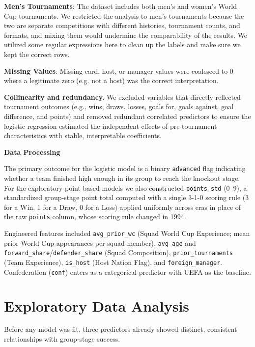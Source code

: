 \documentclass{article}
\begin{document}
\textbf {Men's Tournaments}: The dataset includes both men's and women's World Cup tournaments. We restricted the analysis to men's tournaments because the two are separate competitions with different histories, tournament counts, and formats, and mixing them would undermine the comparability of the results. We utilized some regular expressions here to clean up the labels and make sure we kept the correct rows.

\textbf{Missing Values}: Missing card, host, or manager values were coalesced
to 0 where a legitimate zero (e.g. not a host) was the
correct interpretation.

\textbf{Collinearity and redundancy.} We excluded variables that directly reflected tournament outcomes (e.g., wins, draws, losses, goals for, goals against, goal difference, and points) and removed redundant correlated predictors to ensure the logistic regression estimated the independent effects of pre-tournament characteristics with stable, interpretable coefficients.

\vspace{2.8em}
\textbf{\large Data Processing}

The primary outcome for the logistic model is a binary \texttt{advanced} flag indicating whether a team finished high enough in its group to reach the knockout stage. For the exploratory point-based models we also constructed \texttt{points\_std} (0--9), a standardized group-stage point total computed with a single 3-1-0 scoring rule (3 for a Win, 1 for a Draw, 0 for a Loss) applied uniformly across eras in place of the raw \texttt{points} column, whose scoring rule changed in 1994.


\noindent Engineered features included \texttt{avg\_prior\_wc} (Squad World Cup Experience; mean prior World Cup appearances per squad member), \texttt{avg\_age} and \texttt{forward\_share}/\texttt{defender\_share} (Squad Composition), \texttt{prior\_tournaments} (Team Experience), \texttt{is\_host} (Host Nation Flag), and \texttt{foreign\_manager}. Confederation (\texttt{conf}) enters as a categorical predictor with UEFA as the baseline.


\vspace{1.8em}

\section {Exploratory Data Analysis}

Before any model was fit, three predictors already showed distinct, consistent relationships with group-stage success.
\end{document}
